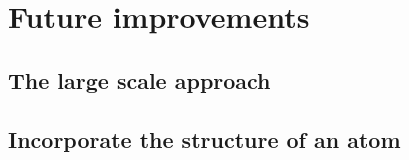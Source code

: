 \chapter{Future improvements}
\section{The large scale approach}
\section{Incorporate the structure of an atom}
